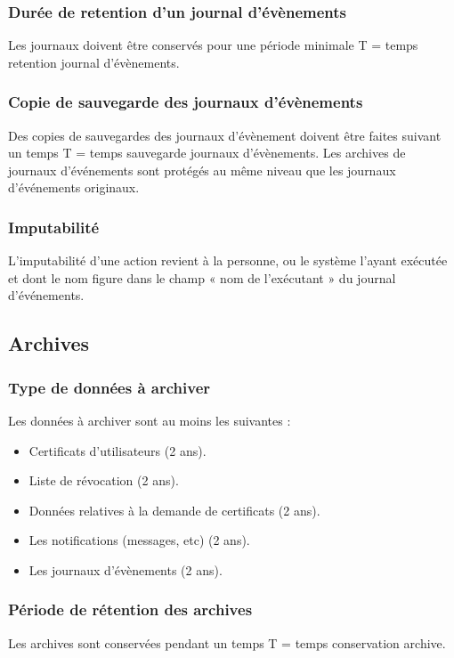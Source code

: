 \documentclass[a4paper,11pt,french]{article}
\begin{document}
\subsubsection{Durée de retention d'un journal d'évènements}
Les journaux doivent être conservés pour une période
minimale T = temps retention journal d'évènements.

\subsubsection{Copie de sauvegarde des journaux d'évènements}
Des copies de sauvegardes des journaux d'évènement doivent être faites suivant un temps T = temps sauvegarde journaux d'évènements. Les archives de journaux d'événements sont protégés au même niveau que les journaux d'événements originaux.

\subsubsection{Imputabilité}
L’imputabilité d’une action revient à la personne, ou le système l’ayant exécutée et dont le nom figure dans le champ « nom de l’exécutant » du journal d’événements.

\subsection{Archives}
\subsubsection{Type de données à archiver}
Les données à archiver sont au moins les suivantes :
\begin{itemize}
\item Certificats d’utilisateurs (2 ans).
\item Liste de révocation (2 ans).
\item Données relatives à la demande de certificats (2 ans).
\item Les notifications (messages, etc) (2 ans).
\item Les journaux d'évènements (2 ans).
\end{itemize}

\subsubsection{Période de rétention des archives}
Les archives sont conservées pendant un temps T = temps conservation archive.
\end{document}
